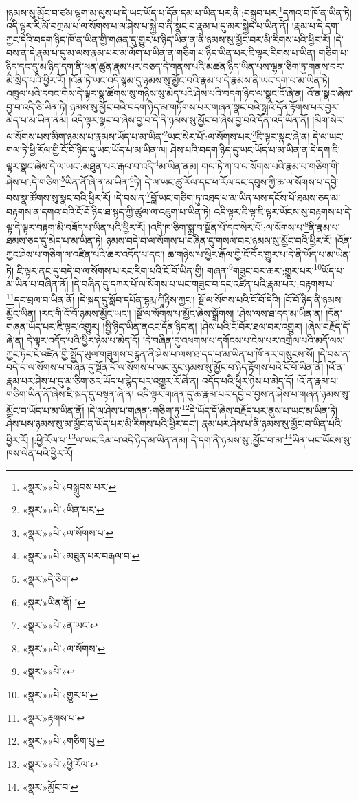 །ཉམས་སུ་མྱོང་བ་ཙམ་ལྷག་མ་ལུས་པ་དེ་ཡང་ཡོད་པ་དོན་དམ་པ་ཡིན་པར་ནི་:བསྒྲུབ་པར་\footnote{«སྣར་»«པེ་»བསྒྲུབས་པར་}དཀའ་བ་ཁོ་ན་ཡིན་ཏེ། འདི་ལྟར་རི་མོ་བཀྲམ་པ་ལ་སོགས་པ་ལ་ཤེས་པ་སྐྱེ་བ་ནི་སྣང་བ་རྣམ་པ་དུ་མར་སྐྱེད་པ་ཡིན་ནོ། །རྣམ་པ་དེ་དག་ཀྱང་དེའི་བདག་ཉིད་ཁོ་ན་ཡིན་གྱི་གཞན་དུ་གྱུར་པ་ཉིད་ཡིན་ན་ནི་ཉམས་སུ་མྱོང་བར་མི་རིགས་པའི་ཕྱིར་རོ། །དེ་བས་ན་དེ་རྣམ་པ་དུ་མ་ལས་རྣམ་པར་མ་ལོག་པ་ཡིན་ན་གཅིག་པ་ཉིད་ཡིན་པར་ཇི་ལྟར་རིགས་པ་ཡིན། གཅིག་པ་ཉིད་དང་དུ་མ་ཉིད་དག་ནི་ཕན་ཚུན་རྣམ་པར་བཅད་དེ་གནས་པའི་མཚན་ཉིད་ཡིན་པས་ལྷན་ཅིག་ཏུ་གནས་བར་མི་སྲིད་པའི་ཕྱིར་རོ། །འོན་ཏེ་ཡང་འདི་སྙམ་དུ་ཉམས་སུ་མྱོང་བའི་རྣམ་པ་དེ་རྣམས་ནི་ཡང་དག་པ་མ་ཡིན་ཏེ། འཁྲུལ་པའི་དབང་གིས་དེ་ལྟར་སྣ་ཚོགས་སུ་གཉིས་སུ་མེད་པའི་ཤེས་པའི་བདག་ཉིད་ལ་སྣང་ངོ་ཞེ་ན། འོ་ན་སྣང་ཞེས་བྱ་བ་འདི་ཅི་ཡིན་ཏེ། ཉམས་སུ་མྱོང་བའི་བདག་ཉིད་མ་གཏོགས་པར་གཞན་སྣང་བའི་སྒྲའི་དོན་རྟོགས་པར་བྱར་མེད་པ་མ་ཡིན་ནམ། འདི་ལྟར་སྣང་བ་ཞེས་བྱ་བ་དེ་ནི་ཉམས་སུ་མྱོང་བ་ཞེས་བྱ་བའི་དོན་འདི་ཡིན་ནོ། །མིག་སེར་ལ་སོགས་པས་མིག་ཉམས་པ་རྣམས་ཡོད་པ་མ་ཡིན་\footnote{«སྣར་»«པེ་»ཡིན་པར་}ཡང་སེར་པོ་:ལ་སོགས་པར་\footnote{«སྣར་»«པེ་»ལ་སོགས་པ་}ཇི་ལྟར་སྣང་ཞེ་ན། དེ་ལ་ཡང་གལ་ཏེ་ཕྱི་རོལ་གྱི་ངོ་བོ་ཉིད་དུ་ཡང་ཡོད་པ་མ་ཡིན་ལ། ཤེས་པའི་བདག་ཉིད་དུ་ཡང་ཡོད་པ་མ་ཡིན་ན་དེ་དག་ཇི་ལྟར་སྣང་ཞེས་དེ་ལ་ཡང་:མཐུན་པར་རྒལ་བ་འདི་\footnote{«སྣར་»«པེ་»མཐུན་པར་བརྒལ་བ་}མ་ཡིན་ནམ། གལ་ཏེ་ཀ་བ་ལ་སོགས་པའི་རྣམ་པ་གཅིག་གི་ཤེས་པ་:དེ་གཅིག་\footnote{«སྣར་»དེ་ཅིག་}ཡིན་ནོ་ཞེ་ན་མ་ཡིན་\footnote{«སྣར་»ཡིན་ནོ། །}ཏེ། དེ་ལ་ཡང་ཚུ་རོལ་དང་ཕ་རོལ་དང་དབུས་ཀྱི་ཆ་ལ་སོགས་པ་དབྱེ་བས་སྣ་ཚོགས་སུ་སྣང་བའི་ཕྱིར་རོ། །དེ་བས་ན་\footnote{«སྣར་»«པེ་»ན་ཡང་}བློ་ཡང་གཅིག་ཏུ་འཐད་པ་མ་ཡིན་པས་དངོས་པོ་ཐམས་ཅད་མ་བརྟགས་ན་དགའ་བའི་ངོ་བོ་ཉིད་ཐ་སྙད་ཀྱི་ཚུལ་ལ་འཇུག་པ་ཡིན་ཏེ། འདི་ལྟར་ཇི་ལྟ་ཇི་ལྟར་ཡོངས་སུ་བརྟགས་པ་དེ་ལྟ་དེ་ལྟར་བརྟག་མི་བཟོད་པ་ཡིན་པའི་ཕྱིར་རོ། །འདི་ཁ་ཅིག་སྨྲ་བ་སྔོན་པོ་དང་སེར་པོ་:ལ་སོགས་པ་\footnote{«སྣར་»«པེ་»ལ་སོགས་}ནི་རྣམ་པ་ཐམས་ཅད་དུ་མེད་པ་མ་ཡིན་ཏེ། ཉམས་བདེ་བ་ལ་སོགས་པ་བཞིན་དུ་གསལ་བར་ཉམས་སུ་མྱོང་བའི་ཕྱིར་རོ། །འོན་ཀྱང་ཤེས་པ་གཅིག་ལ་འཛིན་པའི་ཆར་འདོད་པ་དང་། ཆ་གཉིས་པ་ཕྱིར་རྒོལ་གྱི་ངོ་བོར་གྱུར་པ་དེ་ནི་ཡོད་པ་མ་ཡིན་ཏེ། ཇི་ལྟར་ནང་དུ་བདེ་བ་ལ་སོགས་པ་རང་རིག་པའི་ངོ་བོ་ཡིན་གྱི། གཞན་\footnote{«སྣར་»«པེ་»}གཟུང་བར་ཆར་:གྱུར་པར་\footnote{«སྣར་»«པེ་»གྱུར་པ་}ཡོད་པ་མ་ཡིན་པ་བཞིན་ནོ། །དེ་བཞིན་དུ་དཀར་པོ་ལ་སོགས་པ་ཡང་གཟུང་བ་དང་འཛིན་པའི་རྣམ་པར་:བརྟགས་པ་\footnote{«སྣར་»རྟགས་པ་}དང་བྲལ་བ་ཡིན་ནོ། །དེ་སྐད་དུ་སློབ་དཔོན་དྷརྨ་ཀཱིརྟིས་ཀྱང་། སྔོ་ལ་སོགས་པའི་ངོ་བོ་དེའི། །ངོ་བོ་ཉིད་ནི་ཉམས་མྱོང་ཡིན། །རང་གི་ངོ་བོ་ཉམས་མྱོང་ཡང་། །སྔོ་ལ་སོགས་པ་མྱོང་ཞེས་སྒྲོགས། །ཤེས་ལས་ཐ་དད་མ་ཡིན་ན། །དོན་གཞན་ཡོད་པར་ཇི་ལྟར་འགྱུར། །སྤྱི་ཉིད་ཡིན་ནའང་དོན་ཉིད་ན། །ཤེས་པའི་ངོ་བོར་ཐལ་བར་འགྱུར། །ཞེས་བརྗོད་དོ་ཞེ་ན། དེ་ལྟར་འདོད་པའི་ཕྱིར་ཉེས་པ་མེད་དོ། །དེ་བཞིན་དུ་འཕགས་པ་དགོངས་པ་ངེས་པར་འགྲེལ་པའི་མདོ་ལས་ཀྱང་ཏིང་ངེ་འཛིན་གྱི་སྤྱོད་ཡུལ་གཟུགས་བརྙན་ནི་ཤེས་པ་ལས་ཐ་དད་པ་མ་ཡིན་པ་ཁོ་ནར་གསུངས་སོ། །དེ་བས་ན་བདེ་བ་ལ་སོགས་པ་བཞིན་དུ་སྔོན་པོ་ལ་སོགས་པ་ཡང་རུང་ཉམས་སུ་མྱོང་བ་ཉིད་རྟོགས་པའི་ངོ་བོ་ཡིན་ནོ། །འོ་ན་རྣམ་པར་ཤེས་པ་དུ་མ་ཅིག་ཅར་ཡོད་པ་རྙེད་པར་འགྱུར་རོ་ཞེ་ན། འདོད་པའི་ཕྱིར་ཉེས་པ་མེད་དོ། །འོ་ན་རྣམ་པ་གཅིག་ཡིན་ནོ་ཞེས་ཇི་སྐད་དུ་བསྟན་ཞེ་ན། འདི་ལྟར་གཞན་དུ་ཆ་རྣམ་པར་དབྱེ་བ་བྱས་ན་ཤེས་པ་གཞན་ཉམས་སུ་མྱོང་བ་ཡོད་པ་མ་ཡིན་ནོ། །དེ་ལ་ཤེས་པ་གཞན་:གཅིག་ཏུ་\footnote{«སྣར་»«པེ་»གཅིག་པུ་}དེ་ཡོད་དོ་ཞེས་བརྗོད་པར་ནུས་པ་ཡང་མ་ཡིན་ཏེ། ཤེས་པས་ཉམས་སུ་མ་མྱོང་ན་ཡོད་པར་མི་རིགས་པའི་ཕྱིར་དང་། རྣམ་པར་ཤེས་པ་ནི་ཉམས་སུ་མྱོང་བ་ཡིན་པའི་ཕྱིར་རོ། །:ཕྱི་རོལ་པ་\footnote{«སྣར་»«པེ་»ཕྱི་རོལ་}ལ་ཡང་རིམ་པ་འདི་ཉིད་མ་ཡིན་ནམ། དེ་དག་ནི་ཉམས་སུ་:མྱོང་བ་མ་\footnote{«སྣར་»མྱོང་བ་}ཡིན་ཡང་ཡོངས་སུ་ཁས་ལེན་པའི་ཕྱིར་རོ། 